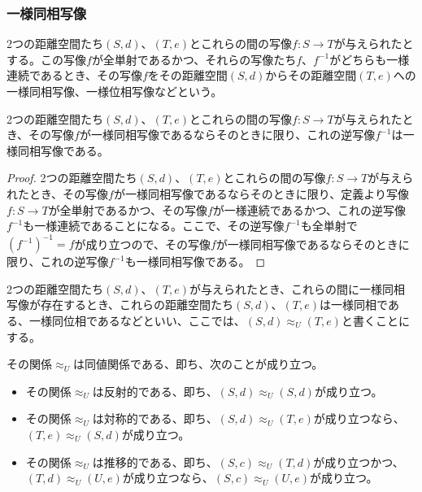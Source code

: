 \documentclass[dvipdfmx]{jsarticle}
\begin{document}
\subsubsection{一様同相写像}%
\begin{dfn}
2つの距離空間たち$(S,d)$、$(T,e)$とこれらの間の写像$f:S \rightarrow T$が与えられたとする。この写像$f$が全単射であるかつ、それらの写像たち$f$、$f^{- 1}$がどちらも一様連続であるとき、その写像$f$をその距離空間$(S,d)$からその距離空間$(T,e)$への一様同相写像、一様位相写像などという。
\end{dfn}
\begin{thm}\label{8.2.4.4}
2つの距離空間たち$(S,d)$、$(T,e)$とこれらの間の写像$f:S \rightarrow T$が与えられたとき、その写像$f$が一様同相写像であるならそのときに限り、これの逆写像$f^{- 1}$は一様同相写像である。
\end{thm}
\begin{proof}
2つの距離空間たち$(S,d)$、$(T,e)$とこれらの間の写像$f:S \rightarrow T$が与えられたとき、その写像$f$が一様同相写像であるならそのときに限り、定義より写像$f:S \rightarrow T$が全単射であるかつ、その写像$f$が一様連続であるかつ、これの逆写像$f^{- 1}$も一様連続であることになる。ここで、その逆写像$f^{- 1}$も全単射で$\left( f^{- 1} \right)^{- 1} = f$が成り立つので、その写像$f$が一様同相写像であるならそのときに限り、これの逆写像$f^{- 1}$も一様同相写像である。
\end{proof}
\begin{dfn}
2つの距離空間たち$(S,d)$、$(T,e)$が与えられたとき、これらの間に一様同相写像が存在するとき、これらの距離空間たち$(S,d)$、$(T,e)$は一様同相である、一様同位相であるなどといい、ここでは、$(S,d) \approx_{U}(T,e)$と書くことにする。
\end{dfn}
\begin{thm}\label{8.2.4.5}
その関係$\approx_{U}$は同値関係である、即ち、次のことが成り立つ。
\begin{itemize}
\item
  その関係$\approx_{U}$は反射的である、即ち、$(S,d) \approx_{U}(S,d)$が成り立つ。
\item
  その関係$\approx_{U}$は対称的である、即ち、$(S,d) \approx_{U}(T,e)$が成り立つなら、$(T,e) \approx_{U}(S,d)$が成り立つ。
\item
  その関係$\approx_{U}$は推移的である、即ち、$(S,c) \approx_{U}(T,d)$が成り立つかつ、$(T,d) \approx_{U}(U,e)$が成り立つなら、$(S,c) \approx_{U}(U,e)$が成り立つ。
\end{itemize}
\end{thm}
\end{document}

